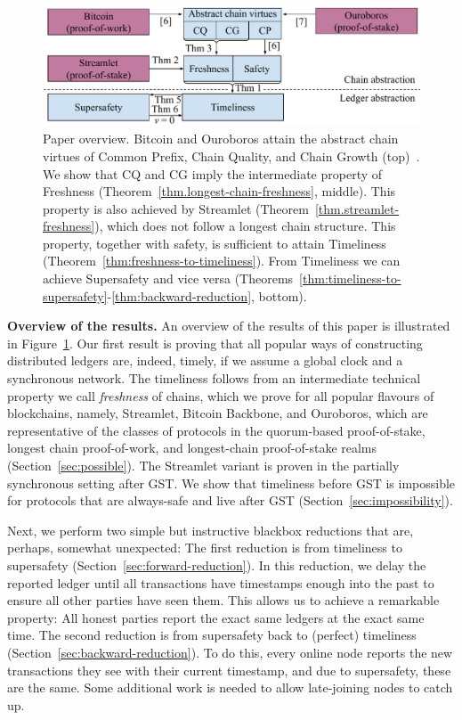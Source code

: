 \begin{figure}
  \centering
  \includegraphics[width=1.0\columnwidth,keepaspectratio]{figures/timeliness-overview.pdf}
  \caption{Paper overview. Bitcoin and Ouroboros attain the abstract chain virtues
  of Common Prefix, Chain Quality, and Chain Growth (top)~\cite{backbone,ouroboros}.
  We show that CQ and CG imply the intermediate property of Freshness
  (Theorem~\ref{thm.longest-chain-freshness}, middle). This property is also achieved by Streamlet
  (Theorem~\ref{thm.streamlet-freshness}), which does
  not follow a longest chain structure. This property, together with safety,
  is sufficient to attain Timeliness
  (Theorem~\ref{thm:freshness-to-timeliness}). From Timeliness we can achieve Supersafety
  and vice versa (Theorems~\ref{thm:timeliness-to-supersafety}-\ref{thm:backward-reduction}, bottom).
  }
 \label{fig:overview}
\end{figure}

\noindent
\textbf{Overview of the results.}
An overview of the results of this paper is illustrated in Figure~\ref{fig:overview}.
Our first result is proving that all popular ways of constructing distributed ledgers
are, indeed, timely, if we assume a global clock and a synchronous network.
The timeliness follows from an intermediate technical property we call \emph{freshness}
of chains, which we prove for all popular flavours of blockchains, namely,
Streamlet, Bitcoin Backbone, and Ouroboros, which are representative
of the classes of protocols in the quorum-based proof-of-stake, longest chain
proof-of-work, and longest-chain proof-of-stake realms (Section~\ref{sec:possible}).
The Streamlet variant is proven in the partially synchronous setting after GST.
We show that timeliness before GST is impossible for protocols that are always-safe
and live after GST (Section~\ref{sec:impossibility}).

Next, we perform two simple but instructive blackbox reductions that are, perhaps, somewhat unexpected:
The first reduction is from timeliness to supersafety (Section~\ref{sec:forward-reduction}).
In this reduction, we delay the reported ledger until all
transactions have timestamps enough into the past to ensure all other parties have seen them.
This allows us to achieve a remarkable property: All honest parties report the
exact same ledgers at the exact same time.
The second reduction is from supersafety back to (perfect) timeliness (Section~\ref{sec:backward-reduction}).
To do this, every online node reports the new transactions they see with
their current timestamp, and due to supersafety, these are the same.
Some additional work is needed to allow late-joining nodes to catch up.


